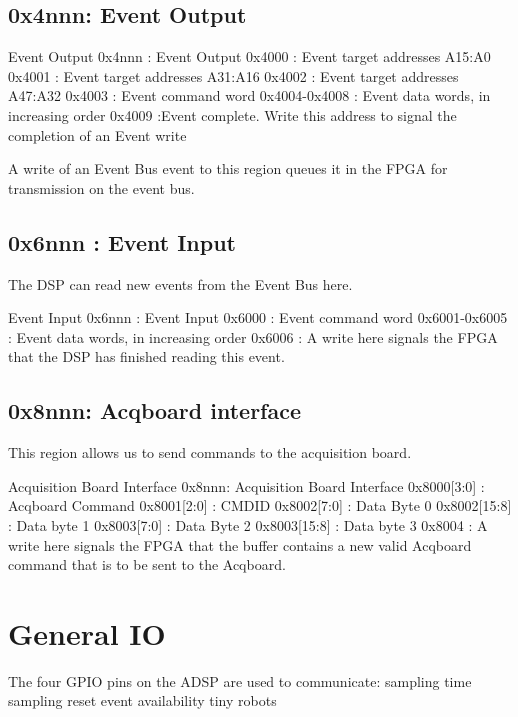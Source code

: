 \subsection{0x4nnn: Event Output} 
\begin{memmap}{Event Output}
0x4nnn : Event Output
0x4000 : Event target addresses A15:A0
0x4001 : Event target addresses A31:A16 
0x4002 : Event target addresses A47:A32
0x4003 : Event command word
0x4004-0x4008 : Event data words, in increasing order
0x4009 :Event complete. Write this address to signal the completion of an Event write
\end{memmap}
A write of an Event Bus event to this region queues it in the FPGA for
transmission on the event bus.

\subsection{0x6nnn : Event Input}
The DSP can read new events from the Event Bus here. 
\begin{memmap}{Event Input}
0x6nnn : Event Input
0x6000 : Event command word
0x6001-0x6005 :  Event data words, in increasing order
0x6006 : A write here signals the FPGA that the DSP has finished reading this event.
\end{memmap}

\subsection{0x8nnn: Acqboard interface}
This region allows us to send commands to the acquisition board. 
\begin{memmap}{Acquisition Board Interface}
0x8nnn: Acquisition Board Interface
0x8000[3:0] : Acqboard Command 
0x8001[2:0] : CMDID 
0x8002[7:0] : Data Byte 0 
0x8002[15:8] : Data byte 1 
0x8003[7:0] : Data Byte 2 
0x8003[15:8] : Data byte 3 
0x8004 : A write here signals the FPGA that the buffer contains a new valid Acqboard command that is to be sent to the Acqboard.
\end{memmap}

\section{General IO}

The four GPIO pins on the ADSP are used to communicate:
sampling time
sampling reset
event availability
tiny robots
